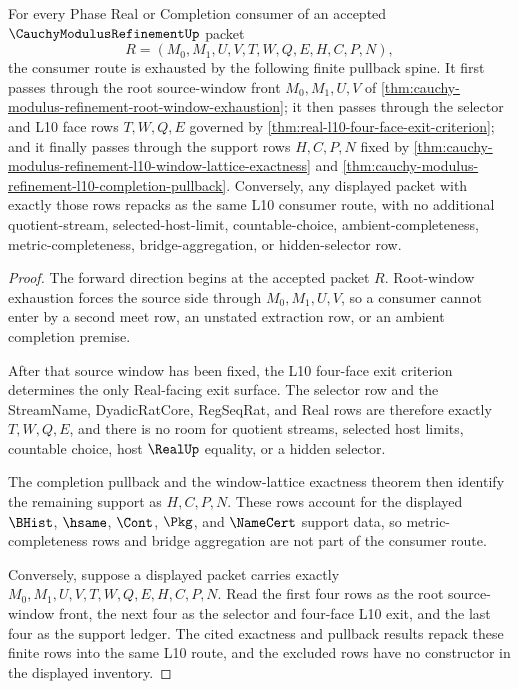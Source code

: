 \begin{theorem}
\label{thm:cauchy-modulus-refinement-l10-root-window-pullback-exhaustion}
For every Phase Real or Completion consumer of an accepted $\CauchyModulusRefinementUp$ packet
$$
R=(M_0,M_1,U,V,T,W,Q,E,H,C,P,N),
$$
the consumer route is exhausted by the following finite pullback spine. It first passes through the root source-window front $M_0,M_1,U,V$ of \autoref{thm:cauchy-modulus-refinement-root-window-exhaustion}; it then passes through the selector and L10 face rows $T,W,Q,E$ governed by \autoref{thm:real-l10-four-face-exit-criterion}; and it finally passes through the support rows $H,C,P,N$ fixed by \autoref{thm:cauchy-modulus-refinement-l10-window-lattice-exactness} and \autoref{thm:cauchy-modulus-refinement-l10-completion-pullback}. Conversely, any displayed packet with exactly those rows repacks as the same L10 consumer route, with no additional quotient-stream, selected-host-limit, countable-choice, ambient-completeness, metric-completeness, bridge-aggregation, or hidden-selector row.
\end{theorem}
\begin{proof}
The forward direction begins at the accepted packet $R$. Root-window exhaustion forces the source side through $M_0,M_1,U,V$, so a consumer cannot enter by a second meet row, an unstated extraction row, or an ambient completion premise.

After that source window has been fixed, the L10 four-face exit criterion determines the only Real-facing exit surface. The selector row and the StreamName, DyadicRatCore, RegSeqRat, and Real rows are therefore exactly $T,W,Q,E$, and there is no room for quotient streams, selected host limits, countable choice, host $\RealUp$ equality, or a hidden selector.

The completion pullback and the window-lattice exactness theorem then identify the remaining support as $H,C,P,N$. These rows account for the displayed $\BHist$, $\hsame$, $\Cont$, $\Pkg$, and $\NameCert$ support data, so metric-completeness rows and bridge aggregation are not part of the consumer route.

Conversely, suppose a displayed packet carries exactly $M_0,M_1,U,V,T,W,Q,E,H,C,P,N$. Read the first four rows as the root source-window front, the next four as the selector and four-face L10 exit, and the last four as the support ledger. The cited exactness and pullback results repack these finite rows into the same L10 route, and the excluded rows have no constructor in the displayed inventory.
\end{proof}

